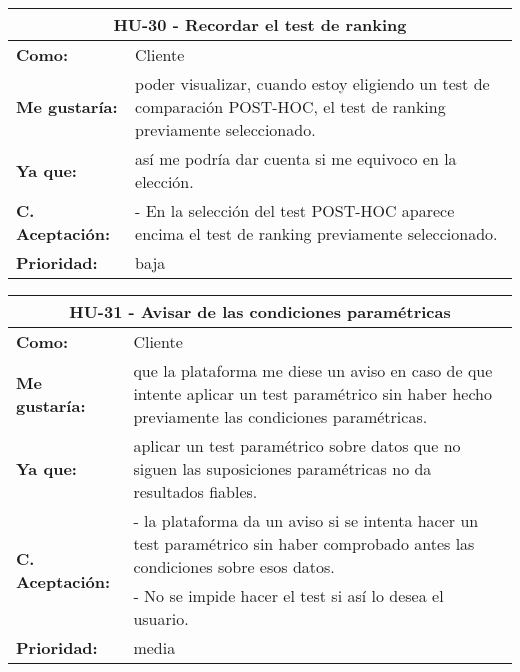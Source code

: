 
\begin{table}[H]
	\begin{tabular}{| p{3cm}| p{11cm} |}
		\hline
		\multicolumn{2}{|c|}{\textbf{HU-30} - Recordar el test de ranking} \\ \hline
		\textbf{Como:} & Cliente \\ \hline
		\textbf{Me gustaría:} & poder visualizar, cuando estoy eligiendo un test de comparación POST-HOC, el test de ranking previamente seleccionado. \\ \hline
		\textbf{Ya que:} & así me podría dar cuenta si me equivoco en la elección. \\ \hline
		\textbf{C. Aceptación:} & - En la selección del test POST-HOC aparece encima el test de ranking previamente seleccionado. \\ \hline
		\textbf{\textbf{Prioridad:}} & baja \\ \hline
	\end{tabular}
\end{table}


\begin{table}[H]
	\begin{tabular}{| p{3cm}| p{11cm} |}
		\hline
		\multicolumn{2}{|c|}{\textbf{HU-31} - Avisar de las condiciones paramétricas} \\ \hline
		\textbf{Como:} & Cliente \\ \hline
		\textbf{Me gustaría:} & que la plataforma me diese un aviso en caso de que intente aplicar un test paramétrico sin haber hecho previamente las condiciones paramétricas. \\ \hline
		\textbf{Ya que:} & aplicar un test paramétrico sobre datos que no siguen las suposiciones paramétricas no da resultados fiables. \\ \hline
		\multirow{2}{11cm}{\textbf{C. Aceptación:}} & - la plataforma da un aviso si se intenta hacer un test paramétrico sin haber comprobado antes las condiciones sobre esos datos. \\
		& - No se impide hacer el test si así lo desea el usuario. \\ \hline
		\textbf{\textbf{Prioridad:}} & media \\ \hline
	\end{tabular}
\end{table}


